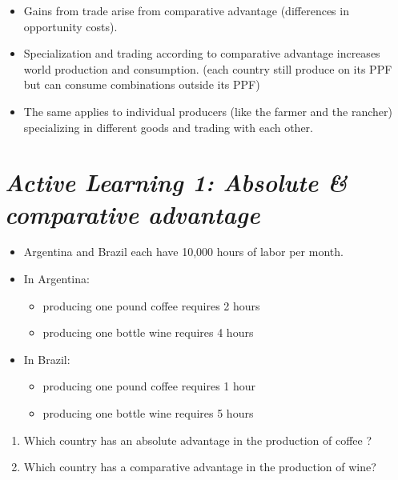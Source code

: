 \documentclass[
]{book}
\providecommand{\tightlist}{%
  \setlength{\itemsep}{0pt}\setlength{\parskip}{0pt}}
\begin{document}
\begin{itemize}
\item
  Gains from trade arise from comparative advantage (differences in opportunity costs).
\item
  Specialization and trading according to comparative advantage increases world production and consumption. (each country still produce on its PPF but can consume combinations outside its PPF)
\item
  The same applies to individual producers (like the farmer and the rancher) specializing in different goods and trading with each other.
\end{itemize}

\hypertarget{active-learning-1-absolute-comparative-advantage}{%
\section{\texorpdfstring{\emph{Active Learning 1: Absolute \& comparative advantage}}{Active Learning 1: Absolute \& comparative advantage}}\label{active-learning-1-absolute-comparative-advantage}}

\begin{itemize}
\item
  Argentina and Brazil each have 10,000 hours of labor per month.
\item
  In Argentina:

  \begin{itemize}
  \tightlist
  \item
    producing one pound coffee requires 2 hours
  \item
    producing one bottle wine requires 4 hours
  \end{itemize}
\item
  In Brazil:

  \begin{itemize}
  \tightlist
  \item
    producing one pound coffee requires 1 hour
  \item
    producing one bottle wine requires 5 hours
  \end{itemize}
\end{itemize}

\begin{enumerate}
\def\labelenumi{\alph{enumi}.}
\item
  Which country has an absolute advantage in the production of coffee ?
\item
  Which country has a comparative advantage in the production of wine?
\end{enumerate}
\end{document}
